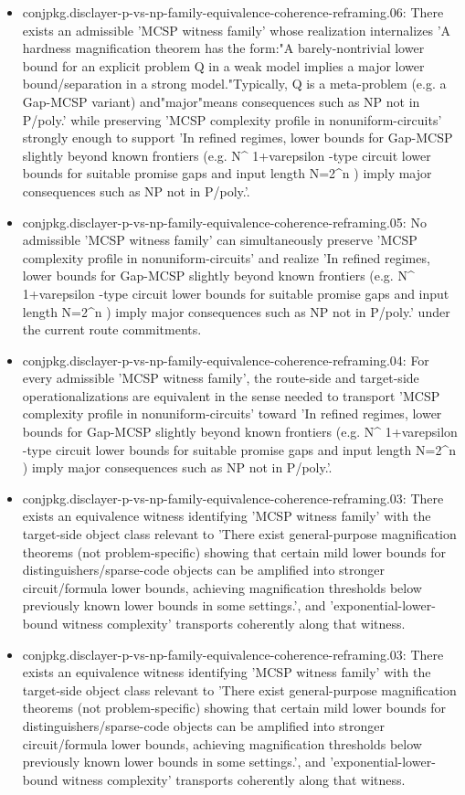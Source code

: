 \documentclass[11pt]{article}
\begin{document}
\begin{itemize}
\item conjpkg.disclayer-p-vs-np-family-equivalence-coherence-reframing.06: There exists an admissible 'MCSP witness family' whose realization internalizes 'A hardness magnification theorem has the form:"A barely-nontrivial lower bound for an explicit problem Q in a weak model implies a major lower bound/separation in a strong model."Typically, Q is a meta-problem (e.g. a Gap-MCSP variant) and"major"means consequences such as NP not in P/poly.' while preserving 'MCSP complexity profile in nonuniform-circuits' strongly enough to support 'In refined regimes, lower bounds for Gap-MCSP slightly beyond known frontiers (e.g. N\textasciicircum{} 1+varepsilon -type circuit lower bounds for suitable promise gaps and input length N=2\textasciicircum{}n ) imply major consequences such as NP not in P/poly.'.
\item conjpkg.disclayer-p-vs-np-family-equivalence-coherence-reframing.05: No admissible 'MCSP witness family' can simultaneously preserve 'MCSP complexity profile in nonuniform-circuits' and realize 'In refined regimes, lower bounds for Gap-MCSP slightly beyond known frontiers (e.g. N\textasciicircum{} 1+varepsilon -type circuit lower bounds for suitable promise gaps and input length N=2\textasciicircum{}n ) imply major consequences such as NP not in P/poly.' under the current route commitments.
\item conjpkg.disclayer-p-vs-np-family-equivalence-coherence-reframing.04: For every admissible 'MCSP witness family', the route-side and target-side operationalizations are equivalent in the sense needed to transport 'MCSP complexity profile in nonuniform-circuits' toward 'In refined regimes, lower bounds for Gap-MCSP slightly beyond known frontiers (e.g. N\textasciicircum{} 1+varepsilon -type circuit lower bounds for suitable promise gaps and input length N=2\textasciicircum{}n ) imply major consequences such as NP not in P/poly.'.
\item conjpkg.disclayer-p-vs-np-family-equivalence-coherence-reframing.03: There exists an equivalence witness identifying 'MCSP witness family' with the target-side object class relevant to 'There exist general-purpose magnification theorems (not problem-specific) showing that certain mild lower bounds for distinguishers/sparse-code objects can be amplified into stronger circuit/formula lower bounds, achieving magnification thresholds below previously known lower bounds in some settings.', and 'exponential-lower-bound witness complexity' transports coherently along that witness.
\item conjpkg.disclayer-p-vs-np-family-equivalence-coherence-reframing.03: There exists an equivalence witness identifying 'MCSP witness family' with the target-side object class relevant to 'There exist general-purpose magnification theorems (not problem-specific) showing that certain mild lower bounds for distinguishers/sparse-code objects can be amplified into stronger circuit/formula lower bounds, achieving magnification thresholds below previously known lower bounds in some settings.', and 'exponential-lower-bound witness complexity' transports coherently along that witness.

\end{itemize}
\end{document}
